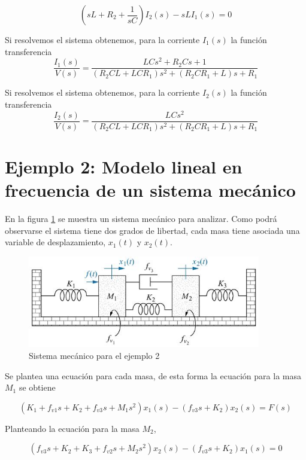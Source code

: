 \documentclass[12pt]{book}
\theoremstyle{definition}
\theoremstyle{remark}
\theoremstyle{plain}
\begin{document}
\begin{equation}
\label{equ411}
(s L + R_2+ \frac{1}{s C}) I_2(s)-s L I_1(s)=0
\end{equation}

Si resolvemos el sistema obtenemos, para la corriente $I_1(s)$ la función transferencia
\begin{equation}
\label{equ412}
\frac{I_1(s)}{V(s)}=\frac{L C s^2 + R_2 C s+1}{(R_2 C L + L C R_1) s^2+(R_2 C R_1 +L)s+R_1}
\end{equation}

Si resolvemos el sistema obtenemos, para la corriente $I_2(s)$ la función transferencia
\begin{equation}
\label{equ413}
\frac{I_2(s)}{V(s)}=\frac{L C s^2 }{(R_2 C L + L C R_1) s^2+(R_2 C R_1 +L)s+R_1}
\end{equation}

\section{Ejemplo 2: Modelo lineal en frecuencia de un sistema mecánico}
En la figura \ref{fig104} se muestra un sistema mecánico para analizar. Como podrá observarse el sistema tiene dos grados de libertad, cada masa tiene asociada una variable de desplazamiento, $x_1(t)$ y $x_2(t)$.
\begin{figure}
\centering
\includegraphics[width=4in]{sistemamecanico1.jpg}
\caption{Sistema mecánico para el ejemplo 2}
\label{fig104}
\end{figure}

Se plantea una ecuación para cada masa, de esta forma la ecuación para la masa $M_1$ se obtiene

\begin{equation}
\label{equ414}
(K_1+f_{v1}s+K_2+f_{v3}s+M_1 s^2) x_1(s)-(f_{v3}s+K_2) x_2(s)= F(s)
\end{equation}

Planteando la ecuación para la masa $M_2$,

\begin{equation}
\label{equ415}
(f_{v3} s +K_2+K_3+f_{v2}s+M_2 s^2) x_2(s)-(f_{v3}s+K_2) x_1(s)=0
\end{equation}
\end{document}
